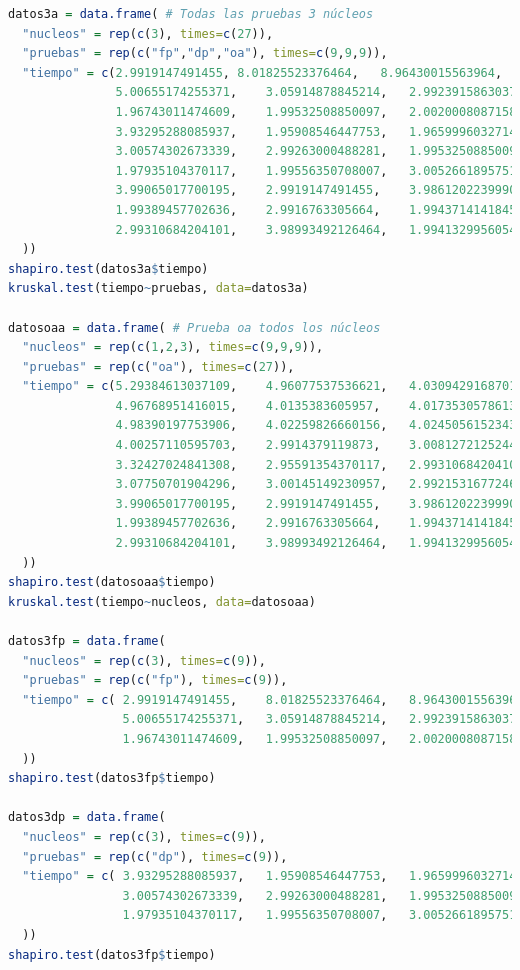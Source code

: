 \documentclass{article}
\begin{document}
\begin{lstlisting}[language=R]
datos3a = data.frame( # Todas las pruebas 3 núcleos
  "nucleos" = rep(c(3), times=c(27)),
  "pruebas" = rep(c("fp","dp","oa"), times=c(9,9,9)),
  "tiempo" = c(2.9919147491455,	8.01825523376464,	8.96430015563964,	
               5.00655174255371,	3.05914878845214,	2.99239158630371,	
               1.96743011474609,	1.99532508850097,	2.00200080871582,	
               3.93295288085937,	1.95908546447753,	1.96599960327148,	
               3.00574302673339,	2.99263000488281,	1.99532508850097,	
               1.97935104370117,	1.99556350708007,	3.00526618957519,	
               3.99065017700195,	2.9919147491455,	3.98612022399902,	
               1.99389457702636,	2.9916763305664,	1.99437141418457,	
               2.99310684204101,	3.98993492126464,	1.99413299560546
  ))
shapiro.test(datos3a$tiempo)
kruskal.test(tiempo~pruebas, data=datos3a)

datosoaa = data.frame( # Prueba oa todos los núcleos
  "nucleos" = rep(c(1,2,3), times=c(9,9,9)),
  "pruebas" = rep(c("oa"), times=c(27)),
  "tiempo" = c(5.29384613037109,	4.96077537536621,	4.03094291687011,	
               4.96768951416015,	4.0135383605957,	4.01735305786132,	
               4.98390197753906,	4.02259826660156,	4.02450561523437, 
               4.00257110595703,	2.9914379119873,	3.00812721252441,	
               3.32427024841308,	2.95591354370117,	2.99310684204101,	
               3.07750701904296,	3.00145149230957,	2.9921531677246, 
               3.99065017700195,	2.9919147491455,	3.98612022399902,	
               1.99389457702636,	2.9916763305664,	1.99437141418457,	
               2.99310684204101,	3.98993492126464,	1.99413299560546
  ))
shapiro.test(datosoaa$tiempo)
kruskal.test(tiempo~nucleos, data=datosoaa)

datos3fp = data.frame(
  "nucleos" = rep(c(3), times=c(9)),
  "pruebas" = rep(c("fp"), times=c(9)),
  "tiempo" = c(	2.9919147491455,	8.01825523376464,	8.96430015563964,	
                5.00655174255371,	3.05914878845214,	2.99239158630371,	
                1.96743011474609,	1.99532508850097,	2.00200080871582
  ))
shapiro.test(datos3fp$tiempo)

datos3dp = data.frame(
  "nucleos" = rep(c(3), times=c(9)),
  "pruebas" = rep(c("dp"), times=c(9)),
  "tiempo" = c(	3.93295288085937,	1.95908546447753,	1.96599960327148,	
                3.00574302673339,	2.99263000488281,	1.99532508850097,	
                1.97935104370117,	1.99556350708007,	3.00526618957519
  ))
shapiro.test(datos3fp$tiempo)

\end{lstlisting}
\end{document}
